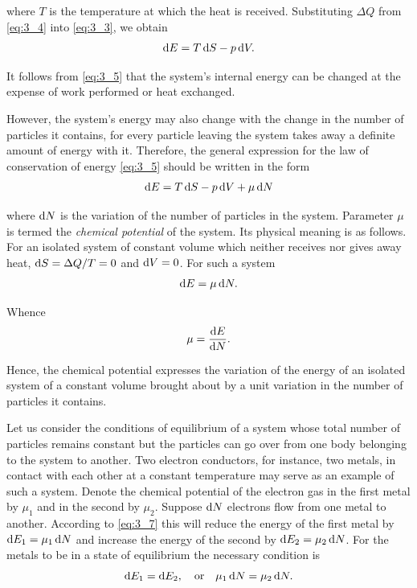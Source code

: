 \noindent
where $T$ is the temperature at which the heat is received. Substituting $\Delta{Q}$ from \eqref{eq:3_4} into \eqref{eq:3_3}, we obtain
\begin{equation}\label{eq:3_5}
    \mathrm{d} E = T\, \mathrm{d} S - p\, \mathrm{d} V.
\end{equation}

\noindent
It follows from \eqref{eq:3_5} that the system's internal energy can be changed at the expense of work performed or heat exchanged.

However, the system's energy may also change with the change in the number of particles it contains, for every particle leaving the system takes away a definite amount of energy with it. Therefore, the general expression for the law of conservation of energy \eqref{eq:3_5} should
be written in the form
\begin{equation}\label{eq:3_6}
    \mathrm{d} E = T\, \mathrm{d} S - p\, \mathrm{d} V + \mu\, \mathrm{d} N
\end{equation}

\noindent
where $\mathrm{d} N$ is the variation of the number of particles in the system. Parameter $\mu$ is termed the \textit{chemical potential} of the system. Its physical meaning is as follows. For an isolated system of constant volume which neither receives nor gives away heat, $\mathrm{d} S=\Delta{Q}/T=0$ and $\mathrm{d} V=0$. For such a system
\begin{equation}\label{eq:3_7}
    \mathrm{d} E = \mu\, \mathrm{d} N.
\end{equation}

\noindent
Whence
\begin{equation}\label{eq:3_8}
    \mu = \dfrac{\mathrm{d} E}{\mathrm{d} N}.
\end{equation}

Hence, the chemical potential expresses the variation of the energy of an isolated system of a constant volume brought about by a unit variation in the number of particles it contains.

Let us consider the conditions of equilibrium of a system whose total number of particles remains constant but the particles can go over from one body belonging to the system to another. Two electron conductors, for instance, two metals, in contact with each other at a constant temperature may serve as an example of such a system. Denote the chemical potential of the electron gas in the first metal by $\mu_1$ and in the second by $\mu_2$. Suppose $\mathrm{d} N$ electrons flow from one metal to another. According to \eqref{eq:3_7} this will reduce the energy of the first metal by $\mathrm{d} E_1=\mu_1\,\mathrm{d} N$ and increase the energy of the second by $\mathrm{d} E_2=\mu_2\,\mathrm{d} N$. For the metals to be in a state of equilibrium the necessary condition is
\begin{equation*}
    \mathrm{d} E_1 = \mathrm{d} E_2,\quad \text{or}\quad \mu_1\,\mathrm{d} N = \mu_2\,\mathrm{d} N.
\end{equation*}

